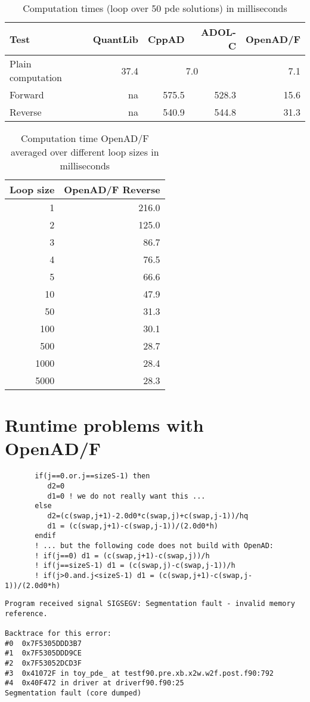 \documentclass{amsart}
\theoremstyle{plain}
\numberwithin{equation}{section}
\begin{document}
\begin{table}[ht]
\caption{Computation times (loop over 50 pde solutions) in milliseconds}
\begin{tabular}{l | r | r | r | r}
Test & QuantLib & CppAD & ADOL-C & OpenAD/F \\ \hline
Plain computation & 37.4 & \multicolumn{2}{c|}{7.0} &  7.1 \\ \hline
Forward & na & 575.5 & 528.3 & 15.6 \\
Reverse & na & 540.9 & 544.8 & 31.3
\end{tabular}
\label{computationTimes}
\end{table}

\begin{table}[ht]
\caption{Computation time OpenAD/F averaged over different loop sizes in milliseconds}
\begin{tabular}{r | r}
Loop size & OpenAD/F Reverse \\ \hline
1 & 216.0 \\
2 & 125.0 \\
3 & 86.7 \\
4 & 76.5 \\
5 & 66.6 \\
10 & 47.9 \\
50 & 31.3 \\
100 & 30.1 \\
500 & 28.7 \\
1000 & 28.4 \\
5000 & 28.3
\end{tabular}
\end{table}

\section{Runtime problems with OpenAD/F}

\begin{verbatim}
       if(j==0.or.j==sizeS-1) then
          d2=0
          d1=0 ! we do not really want this ...
       else
          d2=(c(swap,j+1)-2.0d0*c(swap,j)+c(swap,j-1))/hq
          d1 = (c(swap,j+1)-c(swap,j-1))/(2.0d0*h)
       endif
       ! ... but the following code does not build with OpenAD:
       ! if(j==0) d1 = (c(swap,j+1)-c(swap,j))/h
       ! if(j==sizeS-1) d1 = (c(swap,j)-c(swap,j-1))/h
       ! if(j>0.and.j<sizeS-1) d1 = (c(swap,j+1)-c(swap,j-1))/(2.0d0*h)
\end{verbatim}

\begin{verbatim}
Program received signal SIGSEGV: Segmentation fault - invalid memory reference.

Backtrace for this error:
#0  0x7F5305DDD3B7
#1  0x7F5305DDD9CE
#2  0x7F53052DCD3F
#3  0x41072F in toy_pde_ at testf90.pre.xb.x2w.w2f.post.f90:792
#4  0x40F472 in driver at driverf90.f90:25
Segmentation fault (core dumped)
\end{verbatim}
\end{document}
